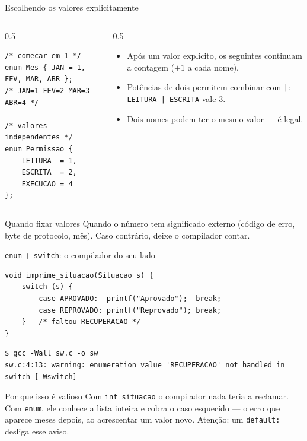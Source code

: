 \documentclass[aspectratio=169]{beamer}
\begin{document}
\begin{frame}[fragile]{Escolhendo os valores explicitamente}
\begin{columns}[T]
\begin{column}{0.5\textwidth}
\begin{lstlisting}[basicstyle=\ttfamily\scriptsize]
/* comecar em 1 */
enum Mes { JAN = 1, FEV, MAR, ABR };
/* JAN=1 FEV=2 MAR=3 ABR=4 */

/* valores independentes */
enum Permissao {
    LEITURA  = 1,
    ESCRITA  = 2,
    EXECUCAO = 4
};
\end{lstlisting}
\end{column}
\begin{column}{0.5\textwidth}
\begin{itemize}
  \item Após um valor explícito, os seguintes continuam a contagem ($+1$ a cada nome).
  \item Potências de dois permitem combinar com \texttt{|}:
    \texttt{LEITURA | ESCRITA} vale 3.
  \item Dois nomes podem ter o mesmo valor --- é legal.
\end{itemize}
\end{column}
\end{columns}
  \begin{exampleblock}{Quando fixar valores}
    Quando o número tem significado externo (código de erro, byte de protocolo,
    mês). Caso contrário, deixe o compilador contar.
  \end{exampleblock}
\end{frame}

\begin{frame}[fragile]{\texttt{enum} + \texttt{switch}: o compilador do seu lado}
\begin{lstlisting}[basicstyle=\ttfamily\scriptsize]
void imprime_situacao(Situacao s) {
    switch (s) {
        case APROVADO:  printf("Aprovado");  break;
        case REPROVADO: printf("Reprovado"); break;
    }   /* faltou RECUPERACAO */
}
\end{lstlisting}
\begin{lstlisting}[language={}, numbers=none, basicstyle=\ttfamily\scriptsize]
$ gcc -Wall sw.c -o sw
sw.c:4:13: warning: enumeration value 'RECUPERACAO' not handled in switch [-Wswitch]
\end{lstlisting}
  \begin{block}{Por que isso é valioso}
    Com \texttt{int situacao} o compilador nada teria a reclamar. Com
    \texttt{enum}, ele conhece a lista inteira e cobra o caso esquecido --- o
    erro que aparece meses depois, ao acrescentar um valor novo. Atenção: um
    \texttt{default:} desliga esse aviso.
  \end{block}
\end{frame}
\end{document}
